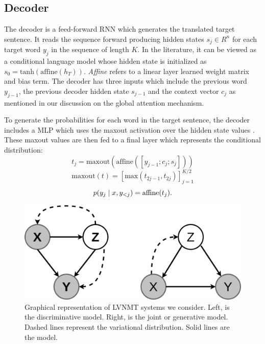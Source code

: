  




\subsection{Decoder}


The decoder is a feed-forward \ac{RNN} which generates the translated target sentence. It reads the sequence forward producing hidden states $s_{j} \in R^{n}$ for each target word $y_{j}$ in the sequence of length $K$. In the literature, it can be viewed as a conditional language model \cite{koehn2017NMT} whose hidden state is initialized as $s_{0} = \text{tanh}(\text{affine}(h_{T}))$. \textit{Affine} refers to a linear layer learned weight matrix and bias term. The decoder has three inputs which include the previous word $y_{j-1}$, the previous decoder hidden state $s_{j-1}$ and the context vector $c_{j}$ as mentioned in our discussion on the global attention mechanism. 


To generate the probabilities for each word in the target sentence, the decoder includes a \ac{MLP} which uses the maxout activation over the hidden state values \cite{goodfellow2013maxout}. These maxout values are then fed to a final layer which represents the conditional distribution:
\begin{equation}
	t_{j} = \text{maxout}(\text{affine}([y_{j-1}; c_{j}; s_{j} ]))
\end{equation}
\begin{equation}
	\text{maxout}(t) = [\text{max}(t_{2j -1}, t_{2j})]_{j=1}^{K / 2}
\end{equation}
\begin{equation}
p(y_{j} \; | \;{x, y_{<j}}) = \text{affine}(t_{j}).
\end{equation}


\begin{figure}
	\includegraphics[width=\linewidth]{PGMofModels.png}
	\caption{Graphical representation of \ac{LVNMT} systems we consider. Left, is the discriminative model. Right, is the joint or generative model. Dashed lines represent the variational distribution. Solid lines are the model.}
	\label{fig:graphicalmodel}
\end{figure}


